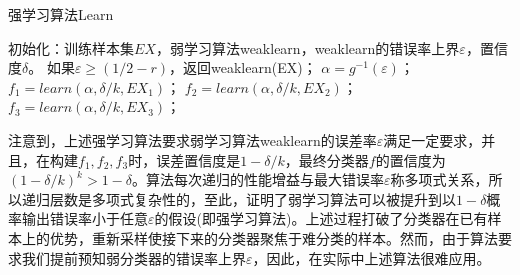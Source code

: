         \begin{algorithm}[H]
            \caption{强学习算法Learn}\label{code:强学习算法}
            \begin{algorithmic}[1]
                \State 初始化：训练样本集$EX$，弱学习算法weaklearn，weaklearn的错误率上界$\varepsilon$，置信度$\delta$。
                \State 如果$\varepsilon \geqslant (1/2 - r)$，返回weaklearn(EX)；
                \State $\alpha = g^{-1}(\varepsilon)$；
                \State $f_1 = learn(\alpha,\delta/k,EX_1)$；
                \State $f_2 = learn(\alpha,\delta/k,EX_2)$；
                \State $f_3 = learn(\alpha,\delta/k,EX_3)$；
            \end{algorithmic}
        \end{algorithm}
        \par
        注意到，上述强学习算法要求弱学习算法weaklearn的误差率$\varepsilon$满足一定要求，并且，在构建$f_1,f_2,f_3$时，误差置信度是$1-\delta/k$，最终分类器$f$的置信度为$(1-\delta/k)^k > 1-\delta$。算法每次递归的性能增益与最大错误率$\varepsilon$称多项式关系，所以递归层数是多项式复杂性的，至此，证明了弱学习算法可以被提升到以$1-\delta$概率输出错误率小于任意$\varepsilon$的假设(即强学习算法)。上述过程打破了分类器在已有样本上的优势，重新采样使接下来的分类器聚焦于难分类的样本。然而，由于算法要求我们提前预知弱分类器的错误率上界$\varepsilon$，因此，在实际中上述算法很难应用。
